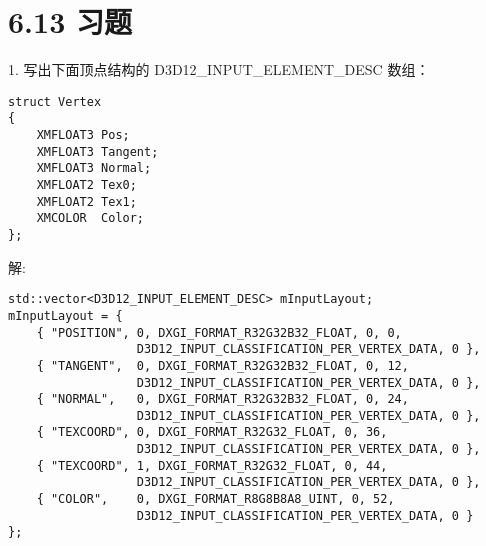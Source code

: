 \chapter*{6.13 习题}
\begin{flushleft}
1. 写出下面顶点结构的 D3D12\_INPUT\_ELEMENT\_DESC 数组：
\end{flushleft}
\begin{lstlisting}
struct Vertex
{
    XMFLOAT3 Pos;
    XMFLOAT3 Tangent;
    XMFLOAT3 Normal;
    XMFLOAT2 Tex0;
    XMFLOAT2 Tex1;
    XMCOLOR  Color;
};
\end{lstlisting}
\begin{flushleft}
解:\\
\end{flushleft}
\begin{lstlisting}
std::vector<D3D12_INPUT_ELEMENT_DESC> mInputLayout;
mInputLayout = {
    { "POSITION", 0, DXGI_FORMAT_R32G32B32_FLOAT, 0, 0, 
                  D3D12_INPUT_CLASSIFICATION_PER_VERTEX_DATA, 0 },
    { "TANGENT",  0, DXGI_FORMAT_R32G32B32_FLOAT, 0, 12, 
                  D3D12_INPUT_CLASSIFICATION_PER_VERTEX_DATA, 0 },
    { "NORMAL",   0, DXGI_FORMAT_R32G32B32_FLOAT, 0, 24, 
                  D3D12_INPUT_CLASSIFICATION_PER_VERTEX_DATA, 0 },
    { "TEXCOORD", 0, DXGI_FORMAT_R32G32_FLOAT, 0, 36, 
                  D3D12_INPUT_CLASSIFICATION_PER_VERTEX_DATA, 0 },
    { "TEXCOORD", 1, DXGI_FORMAT_R32G32_FLOAT, 0, 44, 
                  D3D12_INPUT_CLASSIFICATION_PER_VERTEX_DATA, 0 },
    { "COLOR",    0, DXGI_FORMAT_R8G8B8A8_UINT, 0, 52, 
                  D3D12_INPUT_CLASSIFICATION_PER_VERTEX_DATA, 0 }
};
\end{lstlisting}

